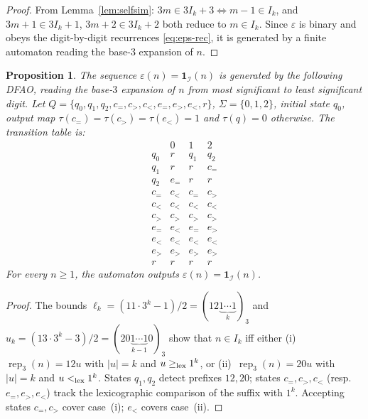 \documentclass[12pt]{article}
\newtheorem{proposition}[theorem]{Proposition}
\theoremstyle{definition}
\theoremstyle{remark}
\begin{document}
\begin{proof}
From Lemma~\ref{lem:selfsim}: $3m\in 3I_k+3\iff m-1\in I_k$, and
$3m+1\in 3I_k+1$, $3m+2\in 3I_k+2$ both reduce to $m\in I_k$.
Since $\varepsilon$ is binary and obeys the digit-by-digit recurrences
\eqref{eq:eps-rec}, it is generated by a finite automaton reading the base-$3$
expansion of $n$.
\end{proof}

\begin{proposition}\label{prop:eps-dfao}
The sequence $\varepsilon(n)=\mathbf{1}_{\mathcal{I}}(n)$ is generated by the following
DFAO, reading the base-$3$ expansion of $n$ from most significant to least significant digit.
Let $Q=\{q_0,q_1,q_2,c_{=},c_{>},c_{<},e_{=},e_{>},e_{<},r\}$, $\Sigma=\{0,1,2\}$,
initial state $q_0$, output map $\tau(c_{=})=\tau(c_{>})=\tau(e_{<})=1$ and $\tau(q)=0$
otherwise. The transition table is:
\[
\begin{array}{c|ccc}
      & 0 & 1 & 2\\ \hline
q_0   & r & q_1 & q_2\\
q_1   & r & r   & c_{=}\\
q_2   & e_{=} & r & r\\
c_{=} & c_{<} & c_{=} & c_{>}\\
c_{<} & c_{<} & c_{<} & c_{<}\\
c_{>} & c_{>} & c_{>} & c_{>}\\
e_{=} & e_{<} & e_{=} & e_{>}\\
e_{<} & e_{<} & e_{<} & e_{<}\\
e_{>} & e_{>} & e_{>} & e_{>}\\
r     & r & r & r
\end{array}
\]
For every $n\ge 1$, the automaton outputs $\varepsilon(n)=\mathbf{1}_{\mathcal{I}}(n)$.
\end{proposition}

\begin{proof}
The bounds $\ell_k=(11\cdot 3^k-1)/2=(12\underbrace{1\cdots1}_{k})_3$ and
$u_k=(13\cdot 3^k-3)/2=(20\underbrace{1\cdots1}_{k-1}0)_3$ show that
$n\in I_k$ iff either (i)~$\operatorname{rep}_3(n)=12u$ with $|u|=k$ and $u\ge_{\rm lex}1^k$,
or (ii)~$\operatorname{rep}_3(n)=20u$ with $|u|=k$ and $u<_{\rm lex}1^k$.
States $q_1,q_2$ detect prefixes $12,20$; states $c_{=},c_{>},c_{<}$ (resp.\ $e_{=},e_{>},e_{<}$)
track the lexicographic comparison of the suffix with $1^k$.
Accepting states $c_{=},c_{>}$ cover case~(i); $e_{<}$ covers case~(ii).
\end{proof}
\end{document}
